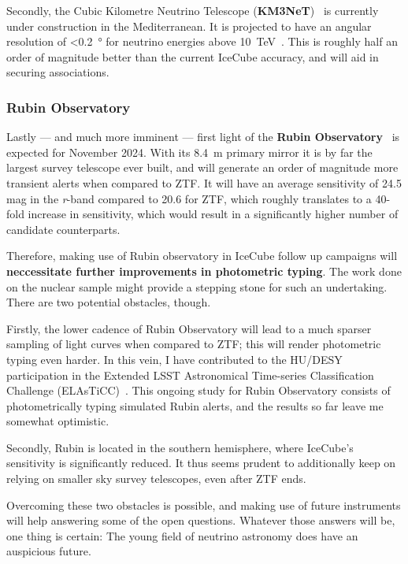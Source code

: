 Secondly, the Cubic Kilometre Neutrino Telescope (\textbf{KM3NeT})~ is currently under construction in the Mediterranean. It is projected to have an angular resolution of \SI{<0.2}{\degree} for neutrino energies above \SI{10}{\tera\eV}~. This is roughly half an order of magnitude better than the current IceCube accuracy, and will aid in securing associations.

\subsubsection{Rubin Observatory}
Lastly --- and much more imminent --- first light of the \textbf{Rubin Observatory}~\cite{Ivezic2019} is expected for November 2024. With its \SI{8.4}{\m} primary mirror it is by far the largest survey telescope ever built, and will generate an order of magnitude more transient alerts when compared to ZTF. It will have an average sensitivity of 24.5 mag in the \textit{r}-band compared to 20.6 for ZTF, which roughly translates to a 40-fold increase in sensitivity, which would result in a significantly higher number of candidate counterparts.

Therefore, making use of Rubin observatory in IceCube follow up campaigns will \textbf{neccessitate further improvements in photometric typing}. The work done on the nuclear sample might provide a stepping stone for such an undertaking. There are two potential obstacles, though.

Firstly, the lower cadence of Rubin Observatory will lead to a much sparser sampling of light curves when compared to ZTF; this will render photometric typing even harder. In this vein, I have contributed to the HU/DESY participation in the Extended LSST Astronomical Time-series Classification Challenge (ELAsTiCC)~. This ongoing study for Rubin Observatory consists of photometrically typing simulated Rubin alerts, and the results so far leave me somewhat optimistic.

Secondly, Rubin is located in the southern hemisphere, where IceCube's sensitivity is significantly reduced. It thus seems prudent to additionally keep on relying on smaller sky survey telescopes, even after ZTF ends.

Overcoming these two obstacles is possible, and making use of future instruments will help answering some of the open questions. Whatever those answers will be, one thing is certain: The young field of neutrino astronomy does have an auspicious future.
